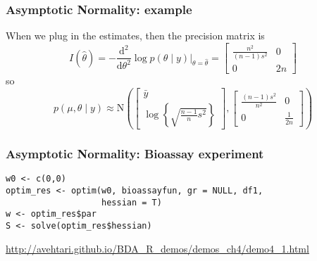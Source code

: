 \documentclass{beamer}
\begin{document}
\begin{frame}
\frametitle{Asymptotic Normality: example}

When we plug in the estimates, then the precision matrix is
$$
I(\hat{\theta} ) = 
-\frac{\text{d}^2}{\text{d}\theta^2} \log p(\theta \mid y) \bigg|_{\theta = \hat{\theta}} = 
\left[ \begin{array}{cc}
\frac{n^2}{(n-1)s^2} & 0 \\
0 & 2n
\end{array}\right]
$$
so
$$
p(\mu, \theta \mid y) \approx \text{N}\left(
\left[\begin{array}{c}
\bar{y}\\
\log \left\{ \sqrt{ \frac{n-1}{n}s^2}  \right\}
\end{array}\right],
\left[ \begin{array}{cc}
\frac{(n-1)s^2}{n^2} & 0 \\
0 & \frac{1}{2n}
\end{array}\right]
\right)
$$
\end{frame}

\begin{frame}[fragile]
\frametitle{Asymptotic Normality: Bioassay experiment}

\begin{verbatim}
w0 <- c(0,0)
optim_res <- optim(w0, bioassayfun, gr = NULL, df1, 
                   hessian = T)
w <- optim_res$par
S <- solve(optim_res$hessian)
\end{verbatim}

\url{http://avehtari.github.io/BDA_R_demos/demos_ch4/demo4_1.html}

\end{frame}
\end{document}
